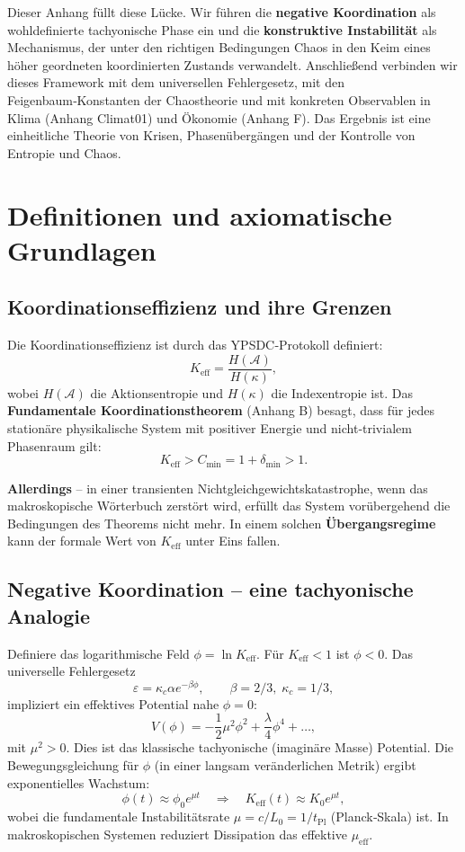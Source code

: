 \documentclass[12pt,a4paper]{article}
\newcommand{\Keff}{K_{\mathrm{eff}}}
\begin{document}
	Dieser Anhang füllt diese Lücke. Wir führen die \textbf{negative Koordination} als wohldefinierte
	tachyonische Phase ein und die \textbf{konstruktive Instabilität} als Mechanismus, der unter den
	richtigen Bedingungen Chaos in den Keim eines höher geordneten koordinierten Zustands verwandelt.
	Anschließend verbinden wir dieses Framework mit dem universellen Fehlergesetz, mit den
	Feigenbaum‑Konstanten der Chaostheorie und mit konkreten Observablen in Klima (Anhang Climat01)
	und Ökonomie (Anhang F). Das Ergebnis ist eine einheitliche Theorie von Krisen, Phasenübergängen
	und der Kontrolle von Entropie und Chaos.
	
	\section{Definitionen und axiomatische Grundlagen}
	
	\subsection{Koordinationseffizienz und ihre Grenzen}
	
	Die Koordinationseffizienz ist durch das YPSDC‑Protokoll definiert:
	\[
	\Keff = \frac{H(\mathcal{A})}{H(\kappa)},
	\]
	wobei $H(\mathcal{A})$ die Aktionsentropie und $H(\kappa)$ die Indexentropie ist.
	Das \textbf{Fundamentale Koordinationstheorem} (Anhang B) besagt, dass für jedes stationäre
	physikalische System mit positiver Energie und nicht‑trivialem Phasenraum gilt:
	\[
	\Keff > C_{\min} = 1 + \delta_{\min} > 1.
	\]
	
	\textbf{Allerdings} – in einer transienten Nichtgleichgewichtskatastrophe, wenn das makroskopische
	Wörterbuch zerstört wird, erfüllt das System vorübergehend die Bedingungen des Theorems nicht mehr.
	In einem solchen \textbf{Übergangsregime} kann der formale Wert von $\Keff$ unter Eins fallen.
	
	\subsection{Negative Koordination – eine tachyonische Analogie}
	
	Definiere das logarithmische Feld $\phi = \ln \Keff$. Für $\Keff < 1$ ist $\phi < 0$.
	Das universelle Fehlergesetz
	\[
	\varepsilon = \kappa_c \alpha e^{-\beta \phi}, \qquad \beta = 2/3,\; \kappa_c = 1/3,
	\]
	impliziert ein effektives Potential nahe $\phi = 0$:
	\[
	V(\phi) = -\frac{1}{2}\mu^2 \phi^2 + \frac{\lambda}{4}\phi^4 + \dots,
	\]
	mit $\mu^2 > 0$. Dies ist das klassische tachyonische (imaginäre Masse) Potential.
	Die Bewegungsgleichung für $\phi$ (in einer langsam veränderlichen Metrik) ergibt exponentielles Wachstum:
	\[
	\phi(t) \approx \phi_0 e^{\mu t} \quad\Longrightarrow\quad \Keff(t) \approx K_0 e^{\mu t},
	\]
	wobei die fundamentale Instabilitätsrate $\mu = c/L_0 = 1/t_{\mathrm{Pl}}$ (Planck‑Skala) ist.
	In makroskopischen Systemen reduziert Dissipation das effektive $\mu_{\mathrm{eff}}$.
	
\end{document}
